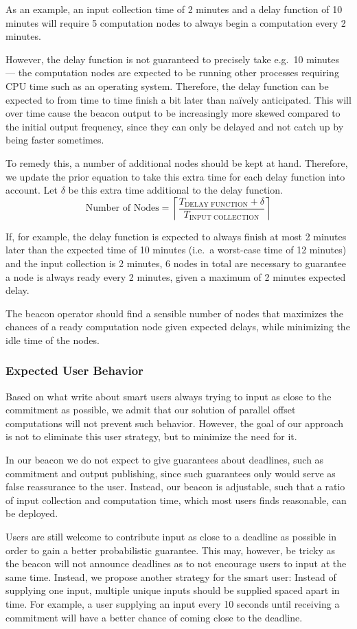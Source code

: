 \noindent
As an example, an input collection time of 2 minutes and a delay function of 10 minutes will require 5 computation nodes to always begin a computation every 2 minutes.

However, the delay function is not guaranteed to precisely take e.g.\ 10 minutes --- the computation nodes are expected to be running other processes requiring CPU time such as an operating system.
Therefore, the delay function can be expected to from time to time finish a bit later than naïvely anticipated.
This will over time cause the beacon output to be increasingly more skewed compared to the initial output frequency, since they can only be delayed and not catch up by being faster sometimes.

To remedy this, a number of additional nodes should be kept at hand.
Therefore, we update the prior equation to take this extra time for each delay function into account.
Let $\delta$ be this extra time additional to the delay function.
\begin{equation*}
    \text{Number of Nodes} = \left\lceil\frac{T_\text{DELAY FUNCTION}+\delta}{T_\text{INPUT COLLECTION}}\right\rceil
\end{equation*}

\noindent
If, for example, the delay function is expected to always finish at most 2 minutes later than the expected time of 10 minutes (i.e.\ a worst-case time of 12 minutes) and the input collection is 2 minutes, 6 nodes in total are necessary to guarantee a node is always ready every 2 minutes, given a maximum of 2 minutes expected delay.

The beacon operator should find a sensible number of nodes that maximizes the chances of a ready computation node given expected delays, while minimizing the idle time of the nodes.

\subsubsection{Expected User Behavior}
Based on what \citet{randomzoo} write about smart users always trying to input as close to the commitment as possible, we admit that our solution of parallel offset computations will not prevent such behavior.
However, the goal of our approach is not to eliminate this user strategy, but to minimize the need for it.

In our beacon we do not expect to give guarantees about deadlines, such as commitment and output publishing, since such guarantees only would serve as false reassurance to the user.
Instead, our beacon is adjustable, such that a ratio of input collection and computation time, which most users finds reasonable, can be deployed.

Users are still welcome to contribute input as close to a deadline as possible in order to gain a better probabilistic guarantee.
This may, however, be tricky as the beacon will not announce deadlines as to not encourage users to input at the same time.
Instead, we propose another strategy for the smart user: Instead of supplying one input, multiple unique inputs should be supplied spaced apart in time.
For example, a user supplying an input every 10 seconds until receiving a commitment will have a better chance of coming close to the deadline.
